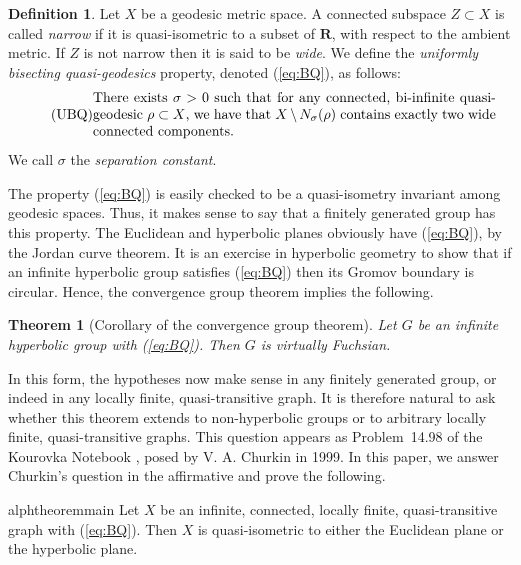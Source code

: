 \documentclass[11pt,a4paper]{amsart}
\newcommand{\R}{\mathbf{R}}
\newtheorem*{theorem*}{Theorem}
\theoremstyle{definition}
\newtheorem{definition}[theorem]{Definition}
\newcommand{\property}{(\ref{eq:BQ})}
\begin{document}
\begin{definition}\label{def:ubq}
    Let $X$ be a geodesic metric space. A connected subspace $Z \subset X$ is called \emph{narrow} if it is quasi-isometric to a subset of $\R$, with respect to the ambient metric. If $Z$ is not narrow then it is said to be \emph{wide}. We define the \emph{uniformly bisecting quasi-geodesics} property, denoted (\ref{eq:BQ}), as follows:
        \begin{equation}
  \tag{$\rm{UBQ}$}\label{eq:BQ}
  \parbox{4in}{%
    \strut
    There exists $\sigma > 0$ such that for any connected, bi-infinite quasi-geodesic $\rho \subset X$, we have that $X \setminus N_\sigma(\rho)$ contains exactly two wide connected components. 
    \strut
  }
\end{equation}
We call $\sigma$ the \emph{separation constant}.
\end{definition}

The property \property{} is easily checked to be a quasi-isometry invariant among geodesic spaces. 
Thus, it makes sense to say that a finitely generated group has this property. The Euclidean and hyperbolic planes obviously have \property{}, by the Jordan curve theorem. It is an exercise in hyperbolic geometry to show that if an infinite hyperbolic group satisfies \property{} then its Gromov boundary is circular. Hence, the convergence group theorem implies the following.

\begin{theorem*}[Corollary of the convergence group theorem]
    Let $G$ be an infinite hyperbolic group with \property{}. Then $G$ is virtually Fuchsian.
\end{theorem*}

In this form, the hypotheses now make sense in any finitely generated group, or indeed in any locally finite, quasi-transitive graph.
It is therefore natural to ask whether this theorem extends to non-hyperbolic groups or to arbitrary locally finite, quasi-transitive graphs. This question appears as Problem~14.98 of the Kourovka Notebook \cite{khukhro2025unsolvedproblemsgrouptheory}, posed by V. A. Churkin in 1999. 
In this paper, we answer Churkin's question in the affirmative and prove the following.


\begin{restatable}{alphtheorem}{main}\label{thm:main-theorem}
    Let $X$ be an infinite, connected, locally finite, quasi-transitive graph with \property{}. Then $X$ is quasi-isometric to either the Euclidean plane or the hyperbolic plane.  
\end{restatable}
\end{document}
